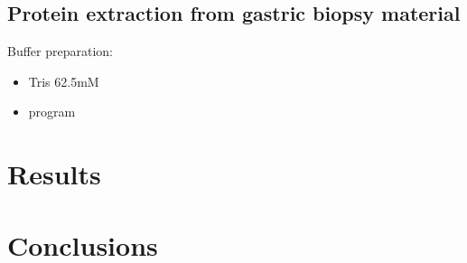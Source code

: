 \documentclass[oneside]{scrbook} %
\begin{document}
\section{Protein extraction from gastric biopsy material}
Buffer preparation:\\
\begin{itemize}
\item Tris 62.5mM
\item program
\end{itemize}
\chapter{Results}
\label{ch:results}
\chapter{Conclusions}
\label{ch:conc}
\backmatter
\printterms[database=glossary]
\printterms[database=acronym]
\printterms[database=notation]
\printbibliography[title={References}] %
\printterms[database=index]
\end{document}
